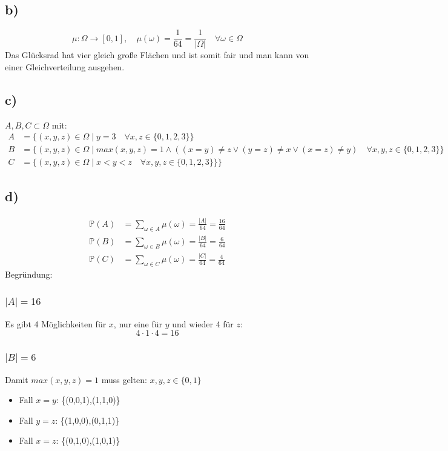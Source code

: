 \documentclass{article} %
\begin{document}
\subsection{b)}
\[
\mu: \Omega \rightarrow [0,1], \quad \mu(\omega) = \frac{1}{64} = \frac{1}{|\Omega|} \quad \forall \omega \in \Omega
\]
Das Glücksrad hat vier gleich große Flächen und ist somit fair und man kann von einer Gleichverteilung ausgehen. 
\subsection{c)}
$A, B, C \subset \Omega$ mit: 
\begin{align*}
    A & =   \{(x,y,z) \in \Omega \mid y = 3 \quad \forall x,z \in \{0,1,2,3\}\}\\
    B &  = \{(x,y,z) \in \Omega \mid max(x,y,z) = 1 \land ((x=y) \neq z \lor (y=z) \neq x \lor (x=z) \neq y) \quad\forall x,y,z \in \{0,1,2,3\}\} \\
    C & = \{(x,y,z) \in \Omega \mid x < y < z \quad\forall x,y,z \in \{0,1,2,3\}\}\}
\end{align*}
\subsection{d)}
\begin{align*}
    \mathbb{P}(A) & = \sum_{\omega \in A} \mu(\omega) = \frac{|A|}{64} = \frac{16}{64}\\
    \mathbb{P}(B) & = \sum_{\omega \in B} \mu(\omega) = \frac{|B|}{64} = \frac{6}{64} \\
    \mathbb{P}(C) & = \sum_{\omega \in C} \mu(\omega) = \frac{|C|}{64} = \frac{4}{64}
\end{align*}
Begründung: 
\subsubsection{$|A| = 16$}
Es gibt 4 Möglichkeiten für $x$, nur eine für $y$ und wieder 4 für $z$:
\[
4 \cdot 1 \cdot 4 = 16
\]
\subsubsection{$|B| = 6$}
Damit $max(x,y,z) = 1$ muss gelten: $x,y,z \in \{0,1\}$
\begin{itemize}
        \item Fall $x = y$: \{(0,0,1),(1,1,0)\}
        \item Fall $y = z$: \{(1,0,0),(0,1,1)\}
        \item Fall $x = z$: \{(0,1,0),(1,0,1)\}
\end{itemize}
\end{document}
